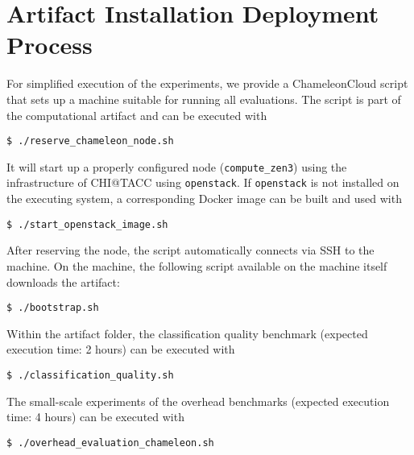 \documentclass[twoside]{article}
\begin{document}
\section*{Artifact Installation Deployment Process}
For simplified execution of the experiments, we provide a ChameleonCloud script that sets up a machine suitable for running all evaluations.
The script is part of the computational artifact and can be executed with
{
\small
\begin{verbatim}
$ ./reserve_chameleon_node.sh
\end{verbatim}
}
It will start up a properly configured node (\texttt{compute\_zen3}) using the infrastructure of CHI@TACC using \texttt{openstack}.
If \texttt{openstack} is not installed on the executing system, a corresponding Docker image can be built and used with
{
\small
\begin{verbatim}
$ ./start_openstack_image.sh
\end{verbatim}
}
After reserving the node, the script automatically connects via SSH to the machine.
On the machine, the following script available on the machine itself downloads the artifact:
{
\small
\begin{verbatim}
$ ./bootstrap.sh
\end{verbatim}
}

Within the artifact folder, the classification quality benchmark (expected execution time: 2 hours) can be executed with
{
\small
\begin{verbatim}
$ ./classification_quality.sh
\end{verbatim}
}

The small-scale experiments of the overhead benchmarks (expected execution time: 4 hours) can be executed with
{
\small
\begin{verbatim}
$ ./overhead_evaluation_chameleon.sh
\end{verbatim}
}
\end{document}
